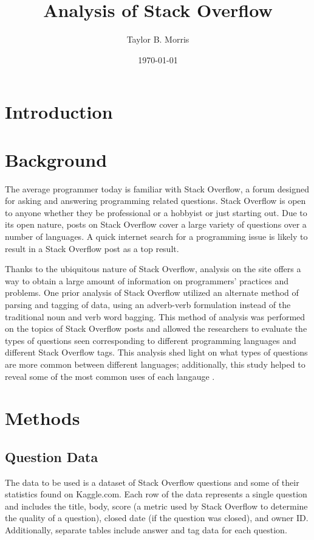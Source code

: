 \documentclass{article}
\author{Taylor B. Morris}
\title{Analysis of Stack Overflow}
\date{\today}
\begin{document}
\maketitle
\begin{abstract}
\end{abstract}
\section{Introduction}
\section{Background}
The average programmer today is familiar with Stack Overflow, a forum
designed for asking and answering programming related questions. Stack
Overflow is open to anyone whether they be professional or a hobbyist or
just starting out. Due to its open nature, posts on Stack Overflow cover
a large variety of questions over a number of languages. A quick internet
search for a programming issue is likely to result in a Stack Overflow post
as a top result.

Thanks to the ubiquitous nature of Stack Overflow, analysis on the site
offers a way to obtain a large amount of information on programmers'
practices and problems. One prior analysis of Stack Overflow utilized an 
alternate method of parsing and tagging of data, using an adverb-verb 
formulation instead of the traditional noun and verb word bagging. This 
method of analysis was performed on the topics of Stack Overflow posts and 
allowed the researchers to evaluate the types of questions seen 
corresponding to different programming languages and different Stack 
Overflow tags. This analysis shed light on what types of questions are more 
common between different languages; additionally, this study helped to 
reveal some of the most common uses of each langauge 
\cite{allamanis2013and}.

\section{Methods}
\subsection{Question Data}
The data to be used is a dataset of Stack Overflow questions and some of
their statistics found on Kaggle.com. Each row of the data represents a
single question and includes the title, body, score (a metric used by Stack
Overflow to determine the quality of a question), closed date (if the
question was closed), and owner ID. Additionally, separate tables include
answer and tag data for each question. 
\end{document}
